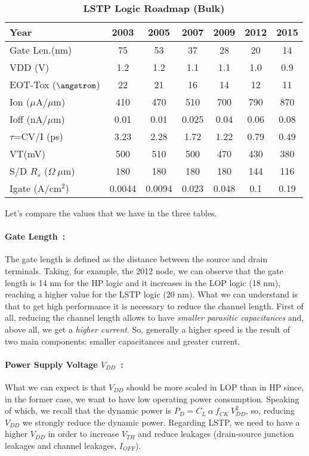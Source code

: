 \documentclass[a4paper, 12pt, twoside, openright]{report}
\begin{document}
 
   \begin{table}[H]
     \centering
     \begin{tabular}{||l||c|c|c|c|c|c||}\hline
      Year          & 2003 & 2005 & 2007 & 2009 & 2012 & 2015\\
      \hline
      \hline       
      Gate Len.(nm)  &75 &53  &37  &28  &20  &14\\ 
      \hline
      VDD (V)  &1.2  &1.2 &1.1 &1.1 &1.0 &0.9\\
      \hline
      EOT-Tox ($\angstrom$) &22 &21 &16 &14 &12 &11\\
      \hline
        {Ion} ($\mu$A/$\mu$m)  &410  &470 &510 &700 &790 &870\\
      \hline
        {Ioff} (nA/$\mu$m)  &0.01 &0.01 &0.025 &0.04  &0.06  &0.08\\
      \hline
        {$\tau$=CV/I} (ps)  &3.23 &2.28 &1.72 &1.22 &0.79 &0.49\\
      \hline
      VT(mV)   &500  &510 &500 &470 &430 &380\\
      \hline
      S/D $R_s$ ($\Omega~\mu$m)   &180 &180 &180 &180 &144 &116\\
      \hline
      Igate (A/cm$^2$)   &0.0044 &0.0094 & 0.023 &0.048 &0.1 &0.19\\
      \hline
     \end{tabular}
     \caption{\textbf{LSTP Logic Roadmap (Bulk)}}

   \end{table}
 

\noindent Let's compare the values that we have in the three tables.

\paragraph{Gate Length~:} The gate length is defined as the distance between the source and drain terminals. Taking, for example, the 2012 node, we can observe that the gate length is 14 nm for the HP logic and it increases in the LOP logic (18 nm), reaching a higher value for the LSTP logic (20 nm). What we can understand is that to get high performance it is necessary to reduce the channel length. First of all, reducing the channel length allows to have \emph{smaller parasitic capacitances} and, above all, we get a \emph{higher current}. So, generally a higher speed is the result of two main components: smaller capacitances and greater current.



\paragraph{Power Supply Voltage $V_{DD}$~:} 
What we can expect is that  $V_{DD}$ should be more scaled in LOP than in HP since, in the former case, we want to have low operating power consumption. 
Speaking of which, we recall that the dynamic power is $P_{D} = C_L \ \alpha \  f_{CK} \ V_{DD}^2$, so, reducing $V_{DD}$ we strongly reduce the dynamic power. Regarding LSTP, we need to have a higher $V_{DD}$ in order to increase $V_{TH}$ and reduce leakages (drain-source junction leakages and channel leakages, $I_{OFF}$). 
\end{document}
